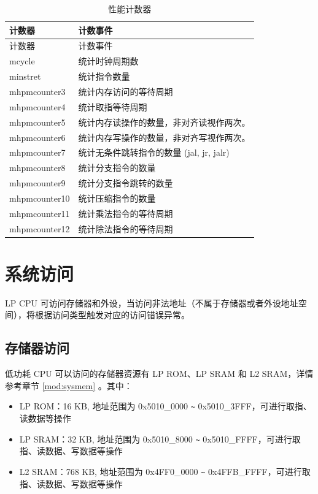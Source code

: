 \documentclass[main\_\_CN.tex]{subfiles}
\begin{document}
\begin{longtable}[c]{|l|l|}
    \caption{性能计数器}\label{tab:ulp-pccr}\\\hline
    \rowcolor{lightgray}
    计数器 & 计数事件 \\\hline
    \endfirsthead
    \hline
    \rowcolor{lightgray}
    计数器 & 计数事件 \\\hline
    \endhead
    \endfoot

    mcycle      & 统计时钟周期数  \\\hline
    minstret    & 统计指令数量 \\\hline
    mhpmcounter3 & 统计内存访问的等待周期  \\\hline
    mhpmcounter4 & 统计取指等待周期 \\\hline
    mhpmcounter5 &  统计内存读操作的数量，非对齐读视作两次。  \\\hline

    mhpmcounter6 & 统计内存写操作的数量，非对齐写视作两次。 \\\hline
    mhpmcounter7 & 统计无条件跳转指令的数量 (jal, jr, jalr)\\\hline
    mhpmcounter8 & 统计分支指令的数量 \\\hline
    mhpmcounter9 & 统计分支指令跳转的数量  \\\hline
    mhpmcounter10 & 统计压缩指令的数量  \\\hline
    mhpmcounter11 & 统计乘法指令的等待周期  \\\hline
    mhpmcounter12 & 统计除法指令的等待周期  \\\hline

\end{longtable}

\section{系统访问}

LP CPU 可访问存储器和外设，当访问非法地址（不属于存储器或者外设地址空间），将根据访问类型触发对应的访问错误异常。

\subsection{存储器访问}

\chipname{} 低功耗 CPU 可以访问的存储器资源有 LP ROM、LP SRAM 和 L2 SRAM，详情参考章节 \ref{mod:sysmem} \textit{}。其中：
\begin{itemize}
    \item LP ROM：16 KB, 地址范围为 0x5010\_0000 \verb+~+ 0x5010\_3FFF，可进行取指、读数据等操作
    \item LP SRAM：32 KB, 地址范围为 0x5010\_8000 \verb+~+ 0x5010\_FFFF，可进行取指、读数据、写数据等操作
    \item L2 SRAM：768 KB, 地址范围为 0x4FF0\_0000 \verb+~+ 0x4FFB\_FFFF，可进行取指、读数据、写数据等操作
\end{itemize}
\end{document}

